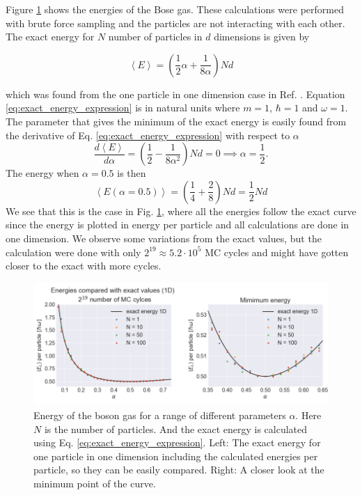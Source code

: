 Figure \ref{fig:exact_comparison_1D} shows the energies of the Bose gas. These calculations were performed with brute force sampling and the particles are not interacting with each other. The exact energy for $N$ number of particles in $d$ dimensions is given by

\begin{equation}\label{eq:exact_energy_expression}
\left< E \right> =\left( \frac{1}{2}\alpha + \frac{1}{8 \alpha}\right)Nd
\end{equation}

which was found from the one particle in one dimension case in Ref. \cite{GriffithsDavidJ1995Itqm}. Equation \ref{eq:exact_energy_expression} is in natural units where $m = 1$, $\hbar = 1$ and $\omega = 1$. The parameter that gives the minimum of the exact energy is easily found from the derivative of Eq. \ref{eq:exact_energy_expression} with respect to $\alpha$
$$ \frac{d \left<E\right>}{d \alpha}  = \left(\frac{1}{2} - \frac{1}{8\alpha^2}\right)Nd = 0 \implies \alpha = \frac{1}{2}. $$
The energy when $\alpha = 0.5$ is then
$$ \left< E(\alpha = 0.5)\right> = \left(\frac{1}{4} + \frac{2}{8}\right)Nd = \frac{1}{2}Nd $$
We see that this is the case in Fig. \ref{fig:exact_comparison_1D}, where all the energies follow the exact curve since the energy is plotted in energy per particle and all calculations are done in one dimension. We observe some variations from the exact values, but the calculation were done with only $2^{19} \approx 5.2\cdot10^{5}$ MC cycles and might have gotten closer to the exact with more cycles.

\begin{figure}[H]
\center
\includegraphics[width=\linewidth]{../Results/comparing_with_exact_1D}\caption{Energy of the boson gas for a range of different parameters $\alpha$. Here $N$ is the number of particles. And the exact energy is calculated using Eq. \ref{eq:exact_energy_expression}. Left: The exact energy for one particle in one dimension including the calculated energies per particle, so they can be easily compared. Right: A closer look at the minimum point of the curve.}\label{fig:exact_comparison_1D}
\end{figure}

